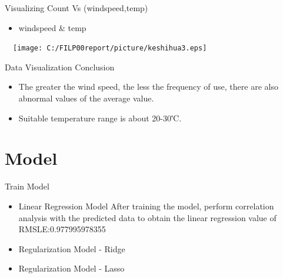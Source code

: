 \documentclass[
 size=14pt,
 paper=smartboard,  %
 mode=present, 		%
 display=slides, 	%
 style=tuliplab,  	%
 pauseslide,
 fleqn,leqno]{powerdot}
\begin{document}
\begin{slide}[toc=,bm=]{Visualizing Count Vs (windspeed,temp)}
\begin{itemize}
\item
windspeed \& temp
\end{itemize}
\vspace{-0.8cm}
\begin{center}
  \texttt{[image: C:/FILP00report/picture/keshihua3.eps]}
\end{center}
\end{slide}


\begin{slide}[toc=,bm=]{Data Visualization Conclusion}
\begin{itemize}
\item
The greater the wind speed, the less the frequency of use, there are also abnormal values of the average value.
\item
Suitable temperature range is about 20-30℃.
\end{itemize}
\end{slide}

\section{Model}

\begin{slide}[toc=,bm=]{Train Model}
\begin{itemize}
\item
Linear Regression Model
After training the model, perform correlation analysis with the predicted data to obtain the linear regression value of RMSLE:0.977995978355
\item
Regularization Model - Ridge
\item
Regularization Model - Lasso
\end{itemize}
\end{slide}


\end{document}
